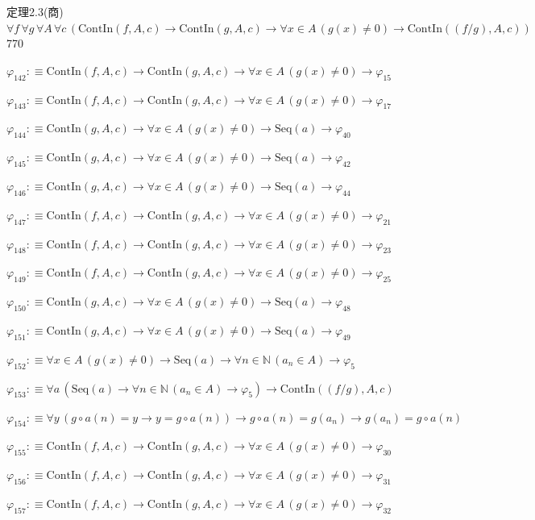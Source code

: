 \begin{fullproof}{定理2.3(商)}{$\forall f\,\forall g\,\forall A\,\forall c\,(\mathrm{ContIn}(f,A,c) \to \mathrm{ContIn}(g,A,c) \to \forall x \in A\,(g(x) \neq 0) \to \mathrm{ContIn}((f / g),A,c))$}{770}
\begin{abbrevlist}
\item $\varphi_{142} :\equiv \mathrm{ContIn}(f,A,c) \to \mathrm{ContIn}(g,A,c) \to \forall x \in A\,(g(x) \neq 0) \to \varphi_{15}$
\item $\varphi_{143} :\equiv \mathrm{ContIn}(f,A,c) \to \mathrm{ContIn}(g,A,c) \to \forall x \in A\,(g(x) \neq 0) \to \varphi_{17}$
\item $\varphi_{144} :\equiv \mathrm{ContIn}(g,A,c) \to \forall x \in A\,(g(x) \neq 0) \to \mathrm{Seq}(a) \to \varphi_{40}$
\item $\varphi_{145} :\equiv \mathrm{ContIn}(g,A,c) \to \forall x \in A\,(g(x) \neq 0) \to \mathrm{Seq}(a) \to \varphi_{42}$
\item $\varphi_{146} :\equiv \mathrm{ContIn}(g,A,c) \to \forall x \in A\,(g(x) \neq 0) \to \mathrm{Seq}(a) \to \varphi_{44}$
\item $\varphi_{147} :\equiv \mathrm{ContIn}(f,A,c) \to \mathrm{ContIn}(g,A,c) \to \forall x \in A\,(g(x) \neq 0) \to \varphi_{21}$
\item $\varphi_{148} :\equiv \mathrm{ContIn}(f,A,c) \to \mathrm{ContIn}(g,A,c) \to \forall x \in A\,(g(x) \neq 0) \to \varphi_{23}$
\item $\varphi_{149} :\equiv \mathrm{ContIn}(f,A,c) \to \mathrm{ContIn}(g,A,c) \to \forall x \in A\,(g(x) \neq 0) \to \varphi_{25}$
\item $\varphi_{150} :\equiv \mathrm{ContIn}(g,A,c) \to \forall x \in A\,(g(x) \neq 0) \to \mathrm{Seq}(a) \to \varphi_{48}$
\item $\varphi_{151} :\equiv \mathrm{ContIn}(g,A,c) \to \forall x \in A\,(g(x) \neq 0) \to \mathrm{Seq}(a) \to \varphi_{49}$
\item $\varphi_{152} :\equiv \forall x \in A\,(g(x) \neq 0) \to \mathrm{Seq}(a) \to \forall n \in \mathbb{N}\,(a_{n} \in A) \to \varphi_{5}$
\item $\varphi_{153} :\equiv \forall a\,(\mathrm{Seq}(a) \to \forall n \in \mathbb{N}\,(a_{n} \in A) \to \varphi_{5}) \to \mathrm{ContIn}((f / g),A,c)$
\item $\varphi_{154} :\equiv \forall y\,(g \circ a(n) = y \to y = g \circ a(n)) \to g \circ a(n) = g(a_{n}) \to g(a_{n}) = g \circ a(n)$
\item $\varphi_{155} :\equiv \mathrm{ContIn}(f,A,c) \to \mathrm{ContIn}(g,A,c) \to \forall x \in A\,(g(x) \neq 0) \to \varphi_{30}$
\item $\varphi_{156} :\equiv \mathrm{ContIn}(f,A,c) \to \mathrm{ContIn}(g,A,c) \to \forall x \in A\,(g(x) \neq 0) \to \varphi_{31}$
\item $\varphi_{157} :\equiv \mathrm{ContIn}(f,A,c) \to \mathrm{ContIn}(g,A,c) \to \forall x \in A\,(g(x) \neq 0) \to \varphi_{32}$

\end{abbrevlist}
\end{fullproof}
